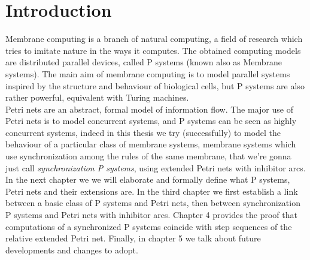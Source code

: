 \chapter{Introduction}

Membrane computing is a branch of natural computing, a field of research which tries to imitate nature in the ways it computes.
The obtained computing models are distributed parallel devices, called P systems (known also as Membrane systems).
The main aim of membrane computing is to model parallel systems inspired by the structure and behaviour of biological cells, but P systems are also rather powerful, equivalent with Turing machines.\\

Petri nets are an abstract, formal model of information flow.
The major use of Petri nets is to model concurrent systems, and P systems can be seen as highly concurrent systems, indeed in this thesis we try (successfully) to model the behaviour of a particular class of membrane systems, membrane systems which use synchronization among the rules of the same membrane, that we're gonna just call \textit{synchronization P systems}, using extended Petri nets with inhibitor arcs. \\

In the next chapter we we will elaborate and formally define what P systems, Petri nets and their extensions are.
In the third chapter we first establish a link between a basic class of P systems and Petri nets, then between synchronization P systems and Petri nets with inhibitor arcs.
Chapter 4 provides the proof that computations of a synchronized P systems coincide with step sequences of the relative extended Petri net. 
Finally, in chapter 5 we talk about future developments and changes to adopt.